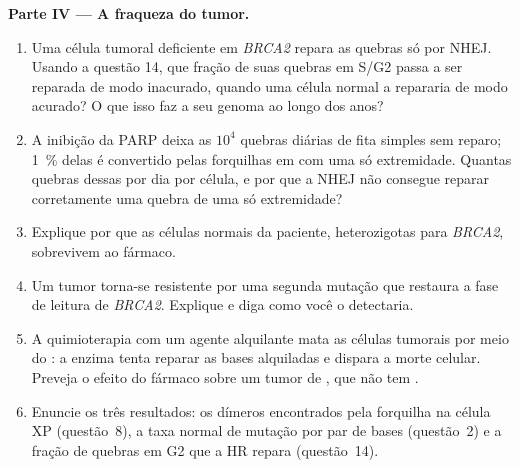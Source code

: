 \begin{problem}
\medskip
\noindent\textbf{Parte IV --- A fraqueza do tumor.}
\begin{enumerate}[resume]
  \item Uma célula tumoral deficiente em \emph{BRCA2} repara as
        quebras só por NHEJ. Usando a questão 14, que fração de suas
        quebras em S/G2 passa a ser reparada de modo inacurado, quando
        uma célula normal a repararia de modo acurado? O que isso faz
        a seu genoma ao longo dos anos?
  \item A inibição da PARP deixa as $10^{4}$ quebras diárias de fita
        simples sem reparo; \qty{1}{\%} delas é convertido pelas
        forquilhas em  com uma só extremidade.
        Quantas quebras dessas por dia por célula, e por que a NHEJ
        não consegue reparar corretamente uma quebra de uma só
        extremidade?
  \item Explique por que as células normais da paciente, heterozigotas
        para \emph{BRCA2}, sobrevivem ao fármaco.
  \item Um tumor torna-se resistente por uma segunda mutação que
        restaura a fase de leitura de \emph{BRCA2}. Explique e diga
        como você o detectaria.
  \item A quimioterapia com um agente alquilante mata as células
        tumorais por meio do : a enzima tenta
        reparar as bases alquiladas e dispara a morte celular. Preveja
        o efeito do fármaco sobre um tumor de , que
        não tem .
  \item Enuncie os três resultados: os dímeros encontrados pela
        forquilha na célula XP (questão~8), a taxa normal de mutação
        por par de bases (questão~2) e a fração de quebras em G2 que a
        HR repara (questão~14).
\end{enumerate}
\end{problem}
